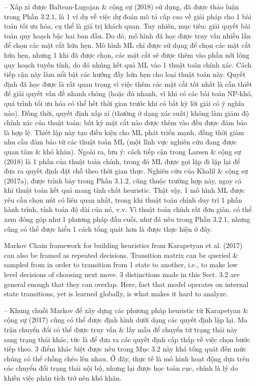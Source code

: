 \documentclass{article}
\begin{document}
\begin{itemize}
\begin{itemize}
\begin{itemize}
            -- Xấp xỉ được Baltean-Lugojan \& cộng sự (2018) sử dụng, đã được thảo luận trong Phần 3.2.1, là 1 ví dụ về việc dự đoán mô tả cấp cao về giải pháp cho 1 bài toán tối ưu hóa, cụ thể là giá trị khách quan. Tuy nhiên, mục tiêu: giải quyết bài toán quy hoạch bậc hai ban đầu. Do đó, mô hình đã học được truy vấn nhiều lần để chọn các mặt cắt hứa hẹn. Mô hình ML chỉ được sử dụng để chọn các mặt cắt hứa hẹn, nhưng 1 khi đã được chọn, các mặt cắt sẽ được thêm vào phần nới lỏng quy hoạch tuyến tính, do đó nhúng kết quả ML vào 1 thuật toán chính xác. Cách tiếp cận này làm nổi bật các hướng đầy hứa hẹn cho loại thuật toán này. Quyết định đã học được là rất quan trọng vì việc thêm các mặt cắt tốt nhất là cần thiết để giải quyết vấn đề nhanh chóng (hoặc đủ nhanh, vì khi có các bài toán NP-khó, quá trình tối ưu hóa có thể hết thời gian trước khi có bất kỳ lời giải có ý nghĩa nào). Đồng thời, quyết định xấp xỉ (thường ở dạng xác suất) không làm giảm độ chính xác của thuật toán: bất kỳ mặt cắt nào được thêm vào đều được đảm bảo là hợp lệ. Thiết lập này tạo điều kiện cho ML phát triển mạnh, đồng thời giảm nhu cầu đảm bảo từ các thuật toán ML (một lĩnh vực nghiên cứu đang được quan tâm \& khó khăn). Ngoài ra, lưu ý: cách tiếp cận trong Larsen \& cộng sự (2018) là 1 phần của thuật toán chính, trong đó ML được gọi lặp đi lặp lại để đưa ra quyết định đặt chỗ theo thời gian thực. Nghiên cứu của Khalil \& cộng sự (2017a), được trình bày trong Phần 3.1.2, cũng thuộc trường hợp này, ngay cả khi thuật toán kết quả mang tính chất heuristic. Thật vậy, 1 mô hình ML được yêu cầu chọn nút có liên quan nhất, trong khi thuật toán chính duy trì 1 phần hành trình, tính toán độ dài của nó, v.v. Vì thuật toán chính rất đơn giản, có thể xem đóng góp như 1 phương pháp đầu cuối, như đã nêu trong Phần 3.2.1, nhưng cũng có thể được hiểu 1 cách tổng quát hơn là được thực hiện ở đây.

            Markov Chain framework for building heuristics from Karapetyan et al. (2017) can also be framed as repeated decisions. Transition matrix can be queried \& sampled from in order to transition from 1 state to another, i.e., to make low level decisions of choosing next move. 3 distinctions made in this Sect. 3.2 are general enough that they can overlap. Here, fact that model operates on internal state transitions, yet is learned globally, is what makes it hard to analyze.

            -- Khung chuỗi Markov để xây dựng các phương pháp heuristic từ Karapetyan \& cộng sự (2017) cũng có thể được định hình dưới dạng các quyết định lặp lại. Ma trận chuyển đổi có thể được truy vấn \& lấy mẫu để chuyển từ trạng thái này sang trạng thái khác, tức là để đưa ra các quyết định cấp thấp về việc chọn bước tiếp theo. 3 điểm khác biệt được nêu trong Mục 3.2 này khá tổng quát đến mức chúng có thể chồng chéo lên nhau. Ở đây, thực tế là mô hình hoạt động dựa trên các chuyển đổi trạng thái nội bộ, nhưng lại được học toàn cục, chính là lý do khiến việc phân tích trở nên khó khăn.


\end{itemize}
\end{itemize}
\end{itemize}
\end{document}
